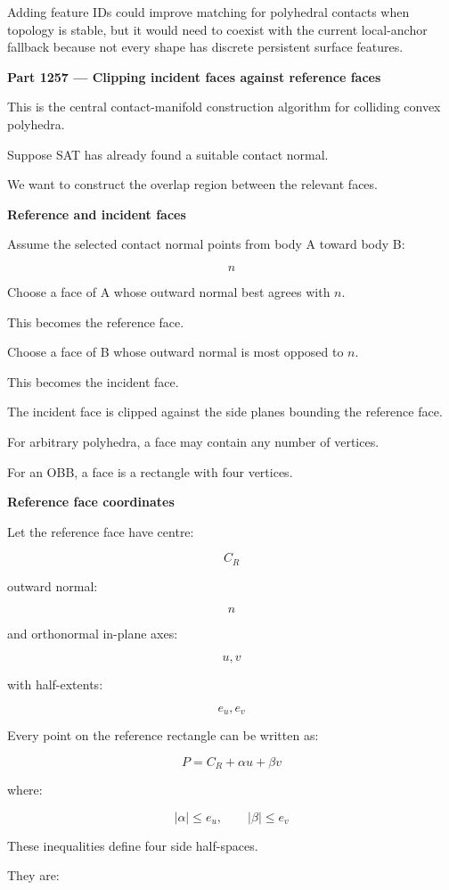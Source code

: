 Adding feature IDs could improve matching for polyhedral contacts when topology is stable, but it would need to coexist with the current local-anchor fallback because not every shape has discrete persistent surface features.

\textbf{Part 1257 --- Clipping incident faces against reference faces}

This is the central contact-manifold construction algorithm for colliding convex polyhedra.

Suppose SAT has already found a suitable contact normal.

We want to construct the overlap region between the relevant faces.

\textbf{Reference and incident faces}

Assume the selected contact normal points from body A toward body B:

\[
n
\]

Choose a face of A whose outward normal best agrees with \(n\).

This becomes the reference face.

Choose a face of B whose outward normal is most opposed to \(n\).

This becomes the incident face.

The incident face is clipped against the side planes bounding the reference face.

For arbitrary polyhedra, a face may contain any number of vertices.

For an OBB, a face is a rectangle with four vertices.

\textbf{Reference face coordinates}

Let the reference face have centre:

\[
C_R
\]

outward normal:

\[
n
\]

and orthonormal in-plane axes:

\[
u,v
\]

with half-extents:

\[
e_u,e_v
\]

Every point on the reference rectangle can be written as:

\[
\boxed{ P=C_R+\alpha u+\beta v }
\]

where:

\[
|\alpha|\le e_u,\qquad|\beta|\le e_v
\]

These inequalities define four side half-spaces.

They are:

